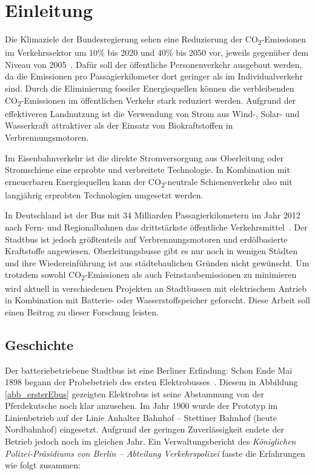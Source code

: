 \chapter{Einleitung}
Die Klimaziele der Bundesregierung sehen eine Reduzierung der CO\textsubscript{2}-Emissionen im Verkehrssektor um 10\% bis 2020 und 40\% bis 2050 vor, jeweils gegenüber dem Niveau von 2005~\cite[S. 46]{BMUB-Referat-KI-I-1:2014}. Dafür soll der öffentliche Personenverkehr ausgebaut werden, da die Emissionen pro Passagierkilometer dort geringer als im Individualverkehr sind. Durch die Eliminierung fossiler Energiequellen können die verbleibenden CO\textsubscript{2}-Emissionen im öffentlichen Verkehr stark reduziert werden. Aufgrund der effektiveren Landnutzung ist die Verwendung von Strom aus Wind-, Solar- und Wasserkraft attraktiver als der Einsatz von Biokraftstoffen in Verbrennungsmotoren.

Im Eisenbahnverkehr ist die direkte Stromversorgung aus Oberleitung oder Stromschiene eine erprobte und verbreitete Technologie. In Kombination mit erneuerbaren Energiequellen kann der CO\textsubscript{2}-neutrale Schienenverkehr also mit langjährig erprobten Technologien umgesetzt werden.

In Deutschland ist der Bus mit 34 Milliarden Passagierkilometern im Jahr 2012 nach Fern- und Regionalbahnen das drittstärkste öffentliche Verkehrsmittel~\cite[S. 13]{Verband-Deutscher-Verkehrsunternehmen:2013}. Der Stadtbus ist jedoch größtenteils auf Verbrennungsmotoren und erdölbasierte Kraftstoffe angewiesen. Oberleitungsbusse gibt es nur noch in wenigen Städten und ihre Wiedereinführung ist aus städtebaulichen Gründen nicht gewünscht. Um trotzdem sowohl CO\textsubscript{2}-Emissionen als auch Feinstaubemissionen zu minimieren wird aktuell in verschiedenen Projekten an Stadtbussen mit elektrischem Antrieb in Kombination mit Batterie- oder Wasserstoffspeicher geforscht. Diese Arbeit soll einen Beitrag zu dieser Forschung leisten.

\section{Geschichte}
\label{abs_geschichte}
Der batteriebetriebene Stadtbus ist eine Berliner Erfindung: Schon Ende Mai 1898 begann der Probebetrieb des ersten Elektrobusses~\cite[S. 8f]{Risch:1957}. Diesem in Abbildung \ref{abb_ersterEbus} gezeigten Elektrobus ist seine Abstammung von der Pferdekutsche noch klar anzusehen.  Im Jahr 1900 wurde der Prototyp im Linienbetrieb auf der Linie Anhalter Bahnhof – Stettiner Bahnhof (heute Nordbahnhof) eingesetzt. Aufgrund der geringen Zuverlässigkeit endete der Betrieb jedoch noch im gleichen Jahr. Ein Verwaltungsbericht des \emph{Königlichen Polizei-Präsidiums von Berlin – Abteilung Verkehrspolizei} fasste die Erfahrungen wie folgt zusammen:

